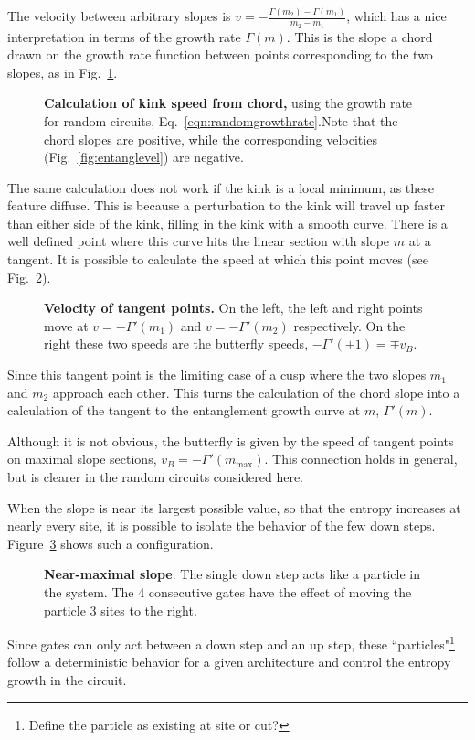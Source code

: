 The velocity between arbitrary slopes is $v = - \frac{\Gamma(m_2)-\Gamma(m_1)}{m_2-m_1}$, which has a nice interpretation in terms of the growth rate $\Gamma(m)$. This is the slope a chord drawn on the growth rate function between points corresponding to the two slopes, as in Fig.~\ref{fig:growthchord}.
\begin{figure}
	\centering
	
	\caption{\textbf{Calculation of kink speed from chord,} using the growth rate for random circuits, Eq.~\ref{eqn:randomgrowthrate}.Note that the chord slopes are positive, while the corresponding velocities (Fig.~\ref{fig:entanglevel}) are negative.}
	\label{fig:growthchord}
\end{figure}

The same calculation does not work if the kink is a local minimum, as these feature diffuse. This is because a perturbation to the kink will travel up faster than either side of the kink, filling in the kink with a smooth curve. There is a well defined point where this curve hits the linear section with slope $m$ at a tangent. It is possible to calculate the speed at which this point moves (see Fig.~\ref{fig:buttvel}).
\begin{figure}
	\centering
	
	\caption{\textbf{Velocity of tangent points.} On the left, the left and right points move at $v=-\Gamma'(m_1)$ and $v=-\Gamma'(m_2)$ respectively. On the right these two speeds are the butterfly speeds, $-\Gamma'(\pm1) = \mp v_B$.}
	\label{fig:buttvel}
\end{figure}
Since this tangent point is the limiting case of a cusp where the two slopes $m_1$ and $m_2$ approach each other. This turns the calculation of the chord slope into a calculation of the tangent to the entanglement growth curve at $m$, $\Gamma'(m)$.

Although it is not obvious, the butterfly is given by the speed of tangent points on maximal slope sections, $v_B = -\Gamma'(m_{\text{max}})$. This connection holds in general, but is clearer in the random circuits considered here.

When the slope is near its largest possible value, so that the entropy increases at nearly every site, it is possible to isolate the behavior of the few down steps. Figure~\ref{fig:particle} shows such a configuration.
\begin{figure}
	\centering
	
	\caption{\textbf{Near-maximal slope}. The single down step acts like a particle in the system. The 4 consecutive gates have the effect of moving the particle 3 sites to the right.}
	\label{fig:particle}
\end{figure}
Since gates can only act between a down step and an up step, these ``particles"\footnote{Define the particle as existing at site or cut?} follow a deterministic behavior for a given architecture and control the entropy growth in the circuit. 

